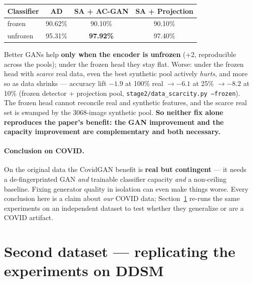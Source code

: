 \documentclass[11pt]{article}
\newcommand{\code}[1]{\texttt{#1}}
\begin{document}
\begin{table}[htbp]
\centering\small
\begin{tabular}{@{}lccc@{}}
\toprule
\textbf{Classifier} & \textbf{AD} & \textbf{SA + AC-GAN} & \textbf{SA + Projection} \\
\midrule
frozen   & 90.62\% & 90.10\% & 90.10\% \\
unfrozen & 95.31\% & \textbf{97.92\%} & 97.40\% \\
\bottomrule
\end{tabular}
\end{table}

\noindent Better GANs help \textbf{only when the encoder is unfrozen} (+2,
reproducible across the pools); under the frozen head they stay flat. Worse: under
the frozen head with \emph{scarce} real data, even the best synthetic pool actively
\emph{hurts}, and more so as data shrinks --- accuracy lift $-1.9$ at 100\% real
$\to -6.1$ at 25\% $\to -8.2$ at 10\% (frozen detector + projection pool,
\code{stage2/data\_scarcity.py --frozen}). The frozen head cannot reconcile real and
synthetic features, and the scarce real set is swamped by the 3068-image synthetic
pool. \textbf{So neither fix alone reproduces the paper's benefit: the GAN
improvement and the capacity improvement are complementary and both necessary.}

\paragraph{Conclusion on COVID.} On the original data the CovidGAN benefit is
\textbf{real but contingent} --- it needs a de-fingerprinted GAN \emph{and} trainable
classifier capacity \emph{and} a non-ceiling baseline. Fixing generator quality in
isolation can even make things worse. Every conclusion here is a claim about
\emph{our} COVID data; Section~\ref{sec:ddsm} re-runs the same experiments on an
independent dataset to test whether they generalize or are a COVID artifact.

\section{Second dataset --- replicating the experiments on DDSM}
\label{sec:ddsm}
\end{document}
